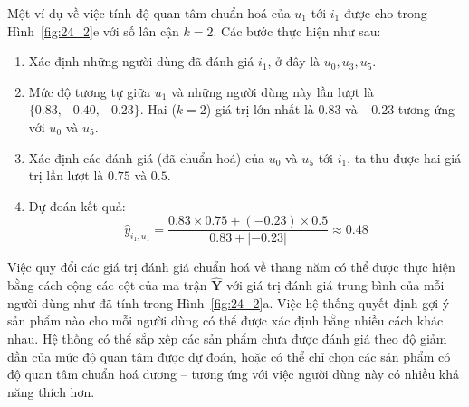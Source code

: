 Một ví dụ về việc tính độ quan tâm chuẩn hoá của $u_1$ tới $i_1$ được cho
trong Hình~\ref{fig:24_2}e với số lân cận $k = 2$. Các
bước thực hiện như sau:
\begin{enumerate}
\item Xác định những người dùng đã đánh giá $i_1$, ở đây là $u_0, u_3,
u_5$.

\item  Mức độ tương tự giữa $u_1$ và những người dùng
này lần lượt là $\{0.83, -0.40, -0.23\}$. Hai ($k = 2$) giá trị lớn nhất là
$0.83$ và $-0.23$ tương ứng với $u_0$ và $u_5$.

\item Xác định các đánh giá (đã chuẩn hoá) của $u_0$ và $u_5$ tới $i_1$, ta
thu được hai giá trị lần lượt là $0.75$ và $0.5$.

\item Dự đoán kết quả:
\begin{equation}
\hat{y}_{i_1, u_1} = \frac{0.83\times 0.75 + (-0.23)\times 0.5}{0.83 + |-0.23|} \approx 0.48
\end{equation}
\end{enumerate}

Việc quy đổi các giá trị đánh giá chuẩn hoá về thang năm có thể được thực hiện
bằng cách cộng các cột của ma trận $\hat{\mathbf{Y}}$ với giá trị
đánh giá trung bình của mỗi người dùng như đã tính trong
Hình~\ref{fig:24_2}a. Việc hệ thống quyết định gợi ý sản phẩm nào cho mỗi
người dùng có thể được xác định bằng nhiều cách khác nhau. Hệ thống có thể
sắp xếp các sản phẩm chưa được đánh giá theo độ giảm dần của mức độ quan tâm được dự đoán, hoặc có thể chỉ chọn các sản phẩm có độ quan tâm chuẩn hoá dương -- tương ứng với việc người dùng
này có nhiều khả năng thích hơn.



